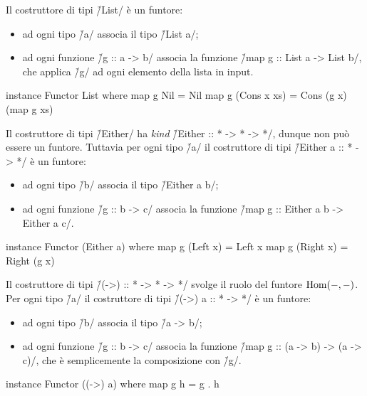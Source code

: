 \begin{frame}[fragile]
Il costruttore di tipi \h/List/ è un funtore:
\begin{itemize}
\item ad ogni tipo \h/a/ associa il tipo \h/List a/;
\item ad ogni funzione \h/g :: a -> b/ associa la funzione \h/map g :: List a -> List b/, che applica \h/g/ ad ogni elemento della lista in input.
\end{itemize}

\begin{haskellcode}
instance Functor List where
    map g Nil = Nil
    map g (Cons x xs) = Cons (g x) (map g xs)
\end{haskellcode}
\end{frame}


\begin{frame}[fragile]
Il costruttore di tipi \h/Either/ ha \emph{kind} \h/Either :: * -> * -> */, dunque non può essere un funtore. Tuttavia per ogni tipo \h/a/ il costruttore di tipi \h/Either a :: * -> */ è un funtore:
\begin{itemize}
\item ad ogni tipo \h/b/ associa il tipo \h/Either a b/;
\item ad ogni funzione \h/g :: b -> c/ associa la funzione \h/map g :: Either a b -> Either a c/.
\end{itemize}

\begin{haskellcode}
instance Functor (Either a) where
    map g (Left x) = Left x
    map g (Right x) = Right (g x)
\end{haskellcode}
\end{frame}


\begin{frame}[fragile]
Il costruttore di tipi \h/(->) :: * -> * -> */ svolge il ruolo del funtore $\operatorname{Hom}(-,-)$. Per ogni tipo \h/a/ il costruttore di tipi \h/(->) a :: * -> */ è un funtore:
\begin{itemize}
\item ad ogni tipo \h/b/ associa il tipo \h/a -> b/;
\item ad ogni funzione \h/g :: b -> c/ associa la funzione \h/map g :: (a -> b) -> (a -> c)/, che è semplicemente la composizione con \h/g/.
\end{itemize}

\begin{haskellcode}
instance Functor ((->) a) where
    map g h = g . h
\end{haskellcode}
\end{frame}
